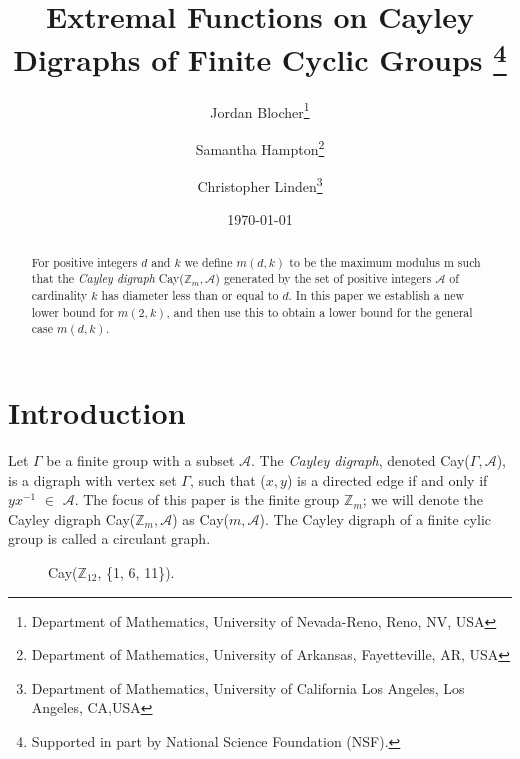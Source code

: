 \documentclass[11pt]{article}
\title{Extremal Functions on Cayley Digraphs of Finite Cyclic Groups \footnote{Supported in part by National Science Foundation (NSF).}}
\author{Jordan Blocher\thanks{Department of Mathematics, University of Nevada-Reno, Reno, NV, USA}\and Samantha Hampton\thanks{Department of Mathematics, University of Arkansas, Fayetteville, AR, USA}\and Christopher Linden\thanks{Department of Mathematics, University of California Los Angeles, Los Angeles, CA,USA } }
\date{\today}
\theoremstyle{definition}
\def\Z{\mbox{$\mathbb Z$}}
\begin{document}
 
\baselineskip6mm\parskip4mm

\maketitle

\begin{abstract}
For positive integers $d$ and $k$ we define $m(d,k)$ to be the maximum modulus m such that the \emph{Cayley digraph} Cay($\Z_{m}, \mathcal{A}$) generated by the set of positive integers $\mathcal{A}$ of cardinality $k$ has diameter less than or equal to $d$. 
In this paper we establish a new lower bound for $m(2, k)$, and then use this to obtain a lower bound for the general case $m(d,k)$.
\end{abstract}
 
\pagebreak

\section{Introduction}
Let $\Gamma$ be a finite group with a subset $\mathcal{A}$. The \emph{Cayley digraph}, denoted Cay($\Gamma, \mathcal{A}$), is a digraph with vertex set $\Gamma$, such that ($x, y$) is a directed edge if and only if $yx^{-1}$ $\in$ $\mathcal{A}$.
The focus of this paper is the finite group $\Z_m$; we will denote the Cayley digraph Cay($\Z_m, \mathcal{A}$) as Cay($m, \mathcal{A}$). The Cayley digraph of a finite cylic group is called a circulant graph.


 \begin{figure}[h]
\begin{center}
\caption{ Cay($\Z_{12}$, \{1, 6, 11\}).}
\end{center}
\end{figure}
\end{document}
